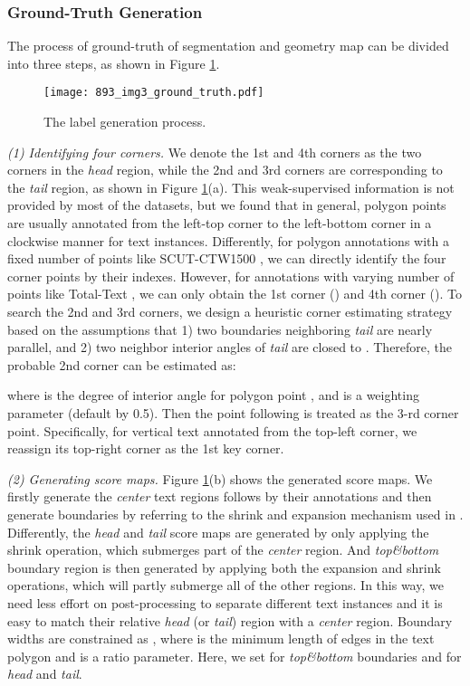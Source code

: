 \documentclass[letterpaper]{article} \usepackage{aaai20}  \usepackage{times}  \usepackage{helvet} \usepackage{courier}  \usepackage[hyphens]{url}  \usepackage{graphicx} \urlstyle{rm} \def\UrlFont{\rm}  \usepackage{graphicx}  \frenchspacing  \setlength{\pdfpagewidth}{8.5in}  \setlength{\pdfpageheight}{11in}  \usepackage{amsmath}
\begin{document}
\subsubsection{Ground-Truth Generation}
The process of ground-truth of segmentation and geometry map can be divided into three steps, as shown in Figure \ref{labelgeneration}.
\begin{figure}
\centering
\texttt{[image: 893\_img3\_ground\_truth.pdf]}\\
\caption{The label generation process.}
\label{labelgeneration}
\end{figure}

\emph{(1) Identifying four corners.}
We denote the 1st and 4th corners as the two corners in the \emph{head} region, while the 2nd and 3rd corners are corresponding to the \emph{tail} region, as shown in Figure \ref{labelgeneration}(a). This weak-supervised information is not provided by most of the datasets, but we found that in general, polygon points  are usually annotated from the left-top corner to the left-bottom corner in a clockwise manner for text instances.
Differently, for polygon annotations with a fixed number of points like SCUT-CTW1500 \cite{liu2019curved}, we can directly identify the four corner points by their indexes.
However, for annotations with varying number of points like Total-Text \cite{ch2017total}, we can only obtain the 1st corner () and 4th corner ().
To search the 2nd and 3rd corners, we design a heuristic corner estimating strategy based on the assumptions that 1) two boundaries neighboring \emph{tail} are nearly parallel, and 2) two neighbor interior angles of \emph{tail} are closed to .
Therefore, the probable 2nd corner can be estimated as:

where  is the degree of interior angle for polygon point , and  is a weighting parameter (default by 0.5).
Then the point  following  is treated as the 3-rd corner point.
Specifically, for vertical text annotated from the top-left corner, we reassign its top-right corner as the 1st key corner.

\emph{(2) Generating score maps.}
Figure \ref{labelgeneration}(b) shows the generated score maps. We firstly generate the \emph{center} text regions follows by their annotations and then generate boundaries by referring to the shrink and expansion mechanism used in \cite{wu2017self}.
Differently, the \emph{head} and \emph{tail} score maps are generated by only applying the shrink operation, which submerges part of the \emph{center} region.
And \emph{top\&bottom} boundary region is then generated by applying both the expansion and shrink operations, which will partly submerge all of the other regions.
In this way, we need less effort on post-processing to separate different text instances and it is easy to match their relative \emph{head} (or \emph{tail}) region with a \emph{center} region.
Boundary widths are constrained as , where  is the minimum length of edges in the text polygon and  is a ratio parameter.
Here, we set  for \emph{top\&bottom} boundaries and  for \emph{head} and \emph{tail}.
\end{document}
